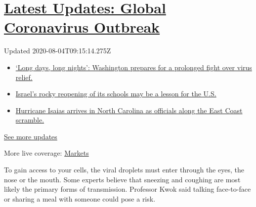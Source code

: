 \hypertarget{latest-updates-global-coronavirus-outbreak}{%
\section{\texorpdfstring{\href{https://www.nytimes3xbfgragh.onion/2020/08/04/world/coronavirus-covid-19.html?action=click\&pgtype=Article\&state=default\&region=MAIN_CONTENT_1\&context=storylines_live_updates}{Latest
Updates: Global Coronavirus
Outbreak}}{Latest Updates: Global Coronavirus Outbreak}}\label{latest-updates-global-coronavirus-outbreak}}

Updated 2020-08-04T09:15:14.275Z

\begin{itemize}
\tightlist
\item
  \href{https://www.nytimes3xbfgragh.onion/2020/08/04/world/coronavirus-covid-19.html?action=click\&pgtype=Article\&state=default\&region=MAIN_CONTENT_1\&context=storylines_live_updates\#link-6b644638}{`Long
  days, long nights': Washington prepares for a prolonged fight over
  virus relief.}
\item
  \href{https://www.nytimes3xbfgragh.onion/2020/08/04/world/coronavirus-covid-19.html?action=click\&pgtype=Article\&state=default\&region=MAIN_CONTENT_1\&context=storylines_live_updates\#link-7af9fca0}{Israel's
  rocky reopening of its schools may be a lesson for the U.S.}
\item
  \href{https://www.nytimes3xbfgragh.onion/2020/08/04/world/coronavirus-covid-19.html?action=click\&pgtype=Article\&state=default\&region=MAIN_CONTENT_1\&context=storylines_live_updates\#link-33bf9168}{Hurricane
  Isaias arrives in North Carolina as officials along the East Coast
  scramble.}
\end{itemize}

\href{https://www.nytimes3xbfgragh.onion/2020/08/04/world/coronavirus-covid-19.html?action=click\&pgtype=Article\&state=default\&region=MAIN_CONTENT_1\&context=storylines_live_updates}{See
more updates}

More live coverage:
\href{https://www.nytimes3xbfgragh.onion/live/2020/08/03/business/stock-market-today-coronavirus?action=click\&pgtype=Article\&state=default\&region=MAIN_CONTENT_1\&context=storylines_live_updates}{Markets}

To gain access to your cells, the viral droplets must enter through the
eyes, the nose or the mouth. Some experts believe that sneezing and
coughing are most likely the primary forms of transmission. Professor
Kwok said talking face-to-face or sharing a meal with someone could pose
a risk.

